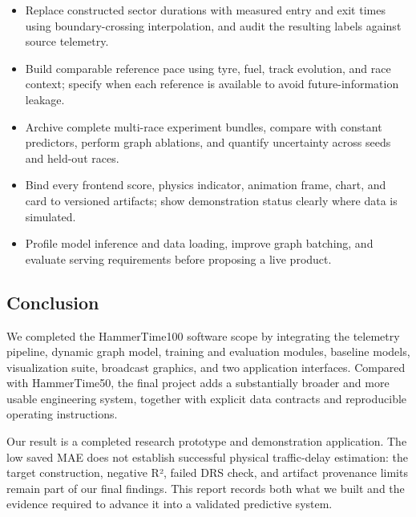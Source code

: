 \documentclass[11pt,a4paper,oneside]{report}
\begin{document}
\begin{itemize}[leftmargin=2em]\item Replace constructed sector durations with measured entry and exit times using boundary-crossing interpolation, and audit the resulting labels against source telemetry.\end{itemize}

\begin{itemize}[leftmargin=2em]\item Build comparable reference pace using tyre, fuel, track evolution, and race context; specify when each reference is available to avoid future-information leakage.\end{itemize}

\begin{itemize}[leftmargin=2em]\item Archive complete multi-race experiment bundles, compare with constant predictors, perform graph ablations, and quantify uncertainty across seeds and held-out races.\end{itemize}

\begin{itemize}[leftmargin=2em]\item Bind every frontend score, physics indicator, animation frame, chart, and card to versioned artifacts; show demonstration status clearly where data is simulated.\end{itemize}

\begin{itemize}[leftmargin=2em]\item Profile model inference and data loading, improve graph batching, and evaluate serving requirements before proposing a live product.\end{itemize}

\subsection*{Conclusion}

We completed the HammerTime100 software scope by integrating the telemetry pipeline, dynamic graph model, training and evaluation modules, baseline models, visualization suite, broadcast graphics, and two application interfaces. Compared with HammerTime50, the final project adds a substantially broader and more usable engineering system, together with explicit data contracts and reproducible operating instructions.

Our result is a completed research prototype and demonstration application. The low saved MAE does not establish successful physical traffic-delay estimation: the target construction, negative R², failed DRS check, and artifact provenance limits remain part of our final findings. This report records both what we built and the evidence required to advance it into a validated predictive system.
\end{document}
